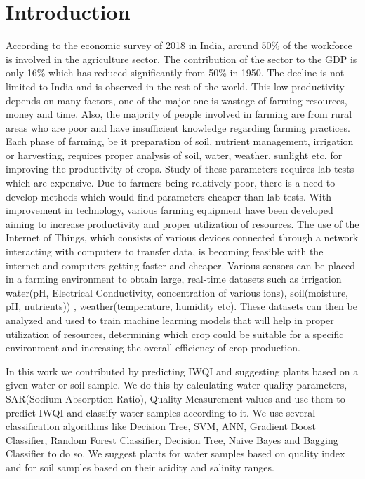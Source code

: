 \section{Introduction}
\label{section:introduction}
According to the economic survey of 2018 in India, around 50\% of the workforce is involved in the agriculture sector\cite{article:indianEconomicSurvey}. The contribution of the sector to the GDP is only 16\% which has reduced significantly from 50\% in 1950. The decline is not limited to India and is observed in the rest of the world. This low productivity depends on many factors, one of the major one is wastage of farming resources, money and time. Also, the majority of people involved in farming are from rural areas who are poor and have insufficient knowledge regarding farming practices. Each phase of farming, be it preparation of soil, nutrient management, irrigation or harvesting, requires proper analysis of soil, water, weather, sunlight etc. for improving the productivity of crops. Study of these parameters requires lab tests which are expensive. Due to farmers being relatively poor, there is a need to develop methods which would find parameters cheaper than lab tests. With improvement in technology, various farming equipment have been developed aiming to increase productivity and proper utilization of resources. The use of the Internet of Things, which consists of various devices connected through a network interacting with computers to transfer data, is becoming feasible with the internet and computers getting faster and cheaper. Various sensors can be placed in a farming environment to obtain large, real-time datasets such as irrigation water(pH, Electrical Conductivity, concentration of various ions), soil(moisture, pH, nutrients)) , weather(temperature, humidity etc). These datasets can then be analyzed and used to train machine learning models that will help in proper utilization of resources, determining which crop could be suitable for a specific environment and increasing the overall efficiency of crop production. 

In this work we contributed by predicting IWQI and suggesting plants based on a given water or soil sample. We do this by calculating water quality parameters, SAR(Sodium Absorption Ratio), Quality Measurement values and use them to predict IWQI and classify water samples according to it. We use several classification algorithms like Decision Tree, SVM, ANN, Gradient Boost Classifier, Random Forest Classifier, Decision Tree, Naive Bayes and Bagging Classifier to do so. We suggest plants for water samples based on quality index and for soil samples based on their acidity and salinity ranges. 

